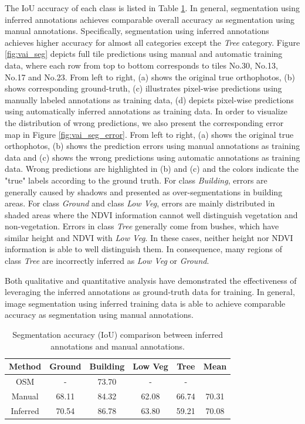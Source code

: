 The IoU accuracy of each class is listed in Table \ref{tab:vai_seg}. In general, segmentation using inferred annotations achieves comparable overall accuracy as segmentation using manual annotations. Specifically, segmentation using inferred annotations achieves higher accuracy for almost all categories except the \textit{Tree} category. Figure \ref{fig:vai_seg} depicts full tile predictions using manual and automatic training data, where each row from top to bottom corresponds to tiles No.30, No.13, No.17 and No.23. From left to right, (a) shows the original true orthophotos, (b) shows corresponding ground-truth, (c) illustrates pixel-wise predictions using manually labeled annotations as training data, (d) depicts pixel-wise predictions using automatically inferred annotations as training data. In order to visualize the distribution of wrong predictions, we also present the corresponding error map in Figure \ref{fig:vai_seg_error}. From left to right, (a) shows the original true orthophotos, (b) shows the prediction errors using manual annotations as training data and (c) shows the wrong predictions using automatic annotations as training data. Wrong predictions are highlighted in (b) and (c) and the colors indicate the "true" labels according to the ground truth. For class \textit{Building}, errors are generally caused by shadows and presented as over-segmentations in building areas. For class \textit{Ground} and class \textit{Low Veg}, errors are mainly distributed in shaded areas where the NDVI information cannot well distinguish vegetation and non-vegetation. Errors in class \textit{Tree} generally come from bushes, which have similar height and NDVI with \textit{Low Veg}. In these cases, neither height nor NDVI information is able to well distinguish them. In consequence, many regions of class \textit{Tree} are incorrectly inferred as \textit{Low Veg} or \textit{Ground}. 

Both qualitative and quantitative analysis have demonstrated the effectiveness of leveraging the inferred annotations as ground-truth data for training. In general, image segmentation using inferred training data is able to achieve comparable accuracy as segmentation using manual annotations. 


\begin{table}[h]
  \centering
  \caption{Segmentation accuracy (IoU) comparison between inferred annotations and manual annotations.}
    \begin{tabular}{cccccc}
    \toprule
    \textbf{Method} & \textbf{Ground} & \textbf{Building} & \textbf{Low Veg} & \textbf{Tree} & \textbf{Mean} \\
          
    \midrule
    OSM     & - & 73.70 & - & - & \\
    Manual  & 68.11  & 84.32  & 62.08  & 66.74 & 70.31\\
    Inferred  & 70.54 & 86.78 & 63.80 & 59.21 &  70.08\\
    \bottomrule
    \end{tabular}%
  \label{tab:vai_seg}%
\end{table}%


